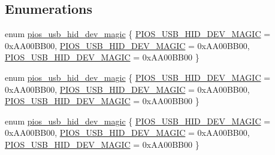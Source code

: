 \subsection*{\-Enumerations}
\begin{DoxyCompactItemize}
\item 
enum \hyperlink{group___p_i_o_s___u_s_b___h_i_d_ga7769ddfbb58cbf13d0e0662f4d441899}{pios\-\_\-usb\-\_\-hid\-\_\-dev\-\_\-magic} \{ \hyperlink{group___p_i_o_s___u_s_b___h_i_d_gga7769ddfbb58cbf13d0e0662f4d441899a5e6367f95628a33741ecc295bcaed279}{\-P\-I\-O\-S\-\_\-\-U\-S\-B\-\_\-\-H\-I\-D\-\_\-\-D\-E\-V\-\_\-\-M\-A\-G\-I\-C} =  0x\-A\-A00\-B\-B00, 
\hyperlink{group___p_i_o_s___u_s_b___h_i_d_gga7769ddfbb58cbf13d0e0662f4d441899a5e6367f95628a33741ecc295bcaed279}{\-P\-I\-O\-S\-\_\-\-U\-S\-B\-\_\-\-H\-I\-D\-\_\-\-D\-E\-V\-\_\-\-M\-A\-G\-I\-C} =  0x\-A\-A00\-B\-B00, 
\hyperlink{group___p_i_o_s___u_s_b___h_i_d_gga7769ddfbb58cbf13d0e0662f4d441899a5e6367f95628a33741ecc295bcaed279}{\-P\-I\-O\-S\-\_\-\-U\-S\-B\-\_\-\-H\-I\-D\-\_\-\-D\-E\-V\-\_\-\-M\-A\-G\-I\-C} =  0x\-A\-A00\-B\-B00
 \}
\item 
enum \hyperlink{group___p_i_o_s___u_s_b___h_i_d_ga7769ddfbb58cbf13d0e0662f4d441899}{pios\-\_\-usb\-\_\-hid\-\_\-dev\-\_\-magic} \{ \hyperlink{group___p_i_o_s___u_s_b___h_i_d_gga7769ddfbb58cbf13d0e0662f4d441899a5e6367f95628a33741ecc295bcaed279}{\-P\-I\-O\-S\-\_\-\-U\-S\-B\-\_\-\-H\-I\-D\-\_\-\-D\-E\-V\-\_\-\-M\-A\-G\-I\-C} =  0x\-A\-A00\-B\-B00, 
\hyperlink{group___p_i_o_s___u_s_b___h_i_d_gga7769ddfbb58cbf13d0e0662f4d441899a5e6367f95628a33741ecc295bcaed279}{\-P\-I\-O\-S\-\_\-\-U\-S\-B\-\_\-\-H\-I\-D\-\_\-\-D\-E\-V\-\_\-\-M\-A\-G\-I\-C} =  0x\-A\-A00\-B\-B00, 
\hyperlink{group___p_i_o_s___u_s_b___h_i_d_gga7769ddfbb58cbf13d0e0662f4d441899a5e6367f95628a33741ecc295bcaed279}{\-P\-I\-O\-S\-\_\-\-U\-S\-B\-\_\-\-H\-I\-D\-\_\-\-D\-E\-V\-\_\-\-M\-A\-G\-I\-C} =  0x\-A\-A00\-B\-B00
 \}
\item 
enum \hyperlink{group___p_i_o_s___u_s_b___h_i_d_ga7769ddfbb58cbf13d0e0662f4d441899}{pios\-\_\-usb\-\_\-hid\-\_\-dev\-\_\-magic} \{ \hyperlink{group___p_i_o_s___u_s_b___h_i_d_gga7769ddfbb58cbf13d0e0662f4d441899a5e6367f95628a33741ecc295bcaed279}{\-P\-I\-O\-S\-\_\-\-U\-S\-B\-\_\-\-H\-I\-D\-\_\-\-D\-E\-V\-\_\-\-M\-A\-G\-I\-C} =  0x\-A\-A00\-B\-B00, 
\hyperlink{group___p_i_o_s___u_s_b___h_i_d_gga7769ddfbb58cbf13d0e0662f4d441899a5e6367f95628a33741ecc295bcaed279}{\-P\-I\-O\-S\-\_\-\-U\-S\-B\-\_\-\-H\-I\-D\-\_\-\-D\-E\-V\-\_\-\-M\-A\-G\-I\-C} =  0x\-A\-A00\-B\-B00, 
\hyperlink{group___p_i_o_s___u_s_b___h_i_d_gga7769ddfbb58cbf13d0e0662f4d441899a5e6367f95628a33741ecc295bcaed279}{\-P\-I\-O\-S\-\_\-\-U\-S\-B\-\_\-\-H\-I\-D\-\_\-\-D\-E\-V\-\_\-\-M\-A\-G\-I\-C} =  0x\-A\-A00\-B\-B00
 \}
\end{DoxyCompactItemize}
